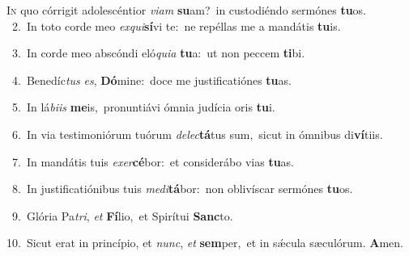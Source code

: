 \lettrine{\initial\textcolor{\initialcolor}{I}}{n} quo córrigit adolescéntior \textit{vi}\-\textit{am} \textbf{su}\-am?~\star in custodiéndo sermónes \textbf{tu}\-os.\\
{\numbfont\textcolor{\numbcolor}{~2.}}~In toto corde meo \textit{ex}\-\textit{qui}\textbf{sí}vi te:~\star ne repéllas me a mandátis \textbf{tu}\-is.\par
{\numbfont\textcolor{\numbcolor}{~3.}}~In corde meo abscóndi eló\-\textit{qui}\-\textit{a} \textbf{tu}\-a:~\star ut non peccem \textbf{ti}\-bi.\par
{\numbfont\textcolor{\numbcolor}{~4.}}~Benedíc\textit{tus} \textit{es}\-, \textbf{Dó}\-mine:~\star doce me justificatiónes \textbf{tu}\-as.\par
{\numbfont\textcolor{\numbcolor}{~5.}}~In lá\-\textit{bi}\-\textit{is} \textbf{me}\-is,~\star pronuntiávi ómnia judícia oris \textbf{tu}\-i.\par
{\numbfont\textcolor{\numbcolor}{~6.}}~In via testimoniórum tuórum \textit{de}\-\textit{lec}\textbf{tá}tus sum,~\star sicut in ómnibus di\-\textbf{ví}\-tiis.\par
{\numbfont\textcolor{\numbcolor}{~7.}}~In mandátis tuis \textit{ex}\-\textit{er}\textbf{cé}bor:~\star et considerábo vias \textbf{tu}\-as.\par
{\numbfont\textcolor{\numbcolor}{~8.}}~In justificatiónibus tuis \textit{me}\-\textit{di}\textbf{tá}bor:~\star non oblivíscar sermónes \textbf{tu}\-os.\par
{\numbfont\textcolor{\numbcolor}{~9.}}~Glória Pa\-\textit{tri}\-, \textit{et} \textbf{Fí}\-lio,~\star et Spirítui \textbf{Sanc}\-to.\par
{\numbfont\textcolor{\numbcolor}{10.}}~Sicut erat in princípio, et \textit{nunc}\-, \textit{et} \textbf{sem}\-per,~\star et in sǽcula sæculórum. \textbf{A}\-men.\par
